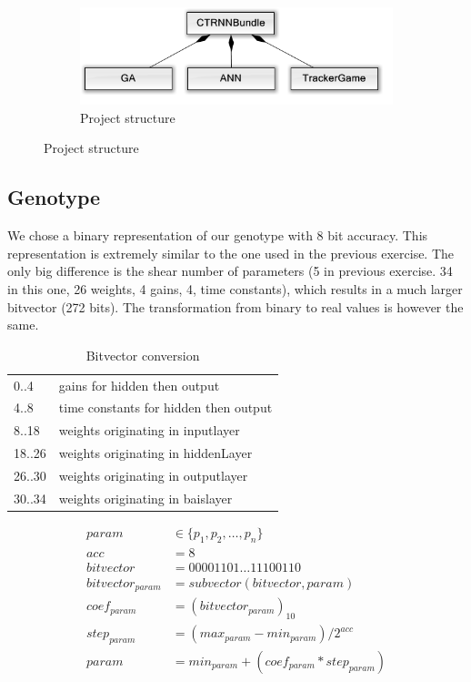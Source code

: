 \documentclass[10pt]{article}
\begin{document}
\begin{figure}
\begin{subfigure}{.3\textwidth}
			\label{fig:trackergamestruct}
		\end{subfigure}
		\begin{subfigure}{.3\textwidth}
			\centering
			\includegraphics[width=\linewidth]{./../images/Structure.png}
			\caption{Project structure}
			\label{fig:struct}
		\end{subfigure}
	\end{figure}

	\subsection{Genotype}
		We chose a binary representation of our genotype with 8 bit accuracy. This representation is extremely similar to the one used in the previous exercise. The only big difference is the shear number of parameters (5 in previous exercise. 34 in this one, 26 weights, 4 gains, 4, time constants), which results in a much larger bitvector (272 bits). The transformation from binary to real values is however the same. 
	\begin{table}[H]
		\parbox{.45\linewidth}{
			\centering
			\begin{tabular}{ll}
				0..4 & gains for hidden then output\\
        4..8 & time constants for hidden then output\\
        8..18 & weights originating in inputlayer\\
				18..26 & weights originating in hiddenLayer\\
        26..30 & weights originating in outputlayer\\
				30..34 & weights originating in baislayer
			\end{tabular}
			\caption{Structure of bitvector}
		}
		\hfill
		\parbox{.45\linewidth}{
			\centering
			\begin{align}
				param &\in \{p_1, p_2, \dots, p_n\}\nonumber\\
				acc &= 8\nonumber\\
				bitvector &= 00001101\dots11100110\nonumber\\
				bitvector_{param} &= subvector(bitvector, param)\nonumber\\
				coef_{param} &= (bitvector_{param})_{10}\nonumber\\
				step_{param} &= (max_{param}-min_{param})/2^{acc}\nonumber\\
				param &= min_{param}+(coef_{param}*step_{param})\nonumber
			\end{align}
			\caption{Bitvector conversion}
		}
	\end{table}
	
\end{document}
